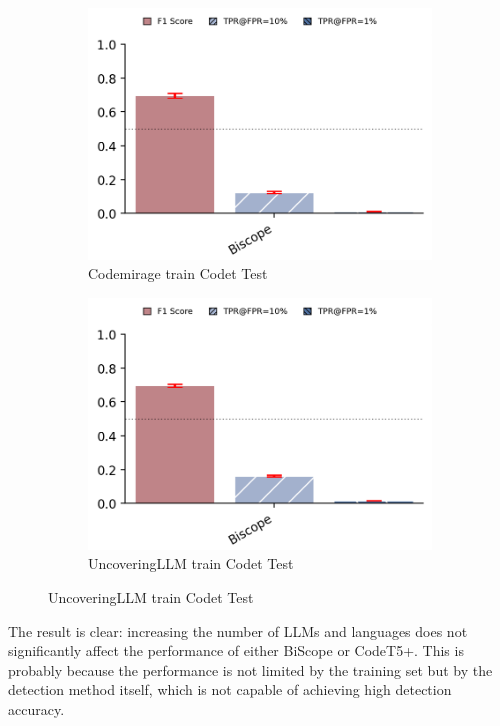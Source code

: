 \begin{figure}[H]
    \begin{subfigure}[b]{0.4\textwidth}
        \centering
        \includegraphics[width=\linewidth]{img/condemiragetrainbiscope.png}
        \caption{Codemirage train Codet Test}
        \label{fig:ffesfe6}
    \end{subfigure}
    \hfill
    \begin{subfigure}[t]{0.4\textwidth}
        \centering
        \includegraphics[width=\linewidth]{img/uncoveringiscope.png}
        \caption{UncoveringLLM train Codet Test}
        \label{fig:bfseds6}
    \end{subfigure}
\end{figure}


The result is clear: increasing the number of LLMs and languages 
does not significantly affect the performance of either BiScope 
or CodeT5+. This is probably because the performance is not 
limited by the training set but by the detection method itself, 
which is not capable of achieving high detection accuracy.

